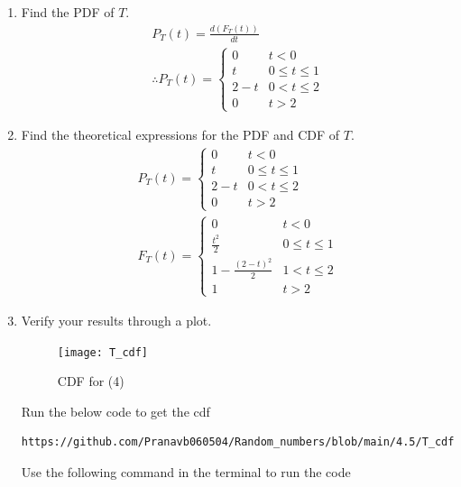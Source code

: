 \documentclass[journal,12pt,twocolumn]{IEEEtran}
\renewcommand\thesection{\arabic{section}}
\begin{document}
\begin{enumerate}[label=\thesection.\arabic*
,ref=\thesection.\theenumi]
\begin{align}
&=1-\frac{(2-t)^{2}}{2}\\
&\therefore F_{T}(t)=P(U_1 +U_2<t)=
\begin{cases}
0 & t<0\\
\frac{t^2}{2} & 0\leq t \leq 1\\
1-\frac{(2-t)^{2}}{2} & 1< t \leq 2\\
1 & t>2
\end{cases}
\end{align}
\item Find the PDF of $T$.\\
\solution 
\begin{align}
P_{T}(t)=\frac{d(F_{T}(t))}{dt}\\
\therefore P_{T}(t)=
\begin{cases}
0 & t<0\\
t & 0\leq t \leq 1\\
2-t  & 0< t \leq 2\\
0 & t>2 
\end{cases}    
\end{align}
\item Find the theoretical expressions for the PDF and CDF of $T$.
\\
\solution
\begin{align}
P_{T}(t)=
\begin{cases}
0 & t<0\\
t & 0\leq t \leq 1\\
2-t  & 0< t \leq 2\\
0 & t>2 
\end{cases} 
\\   
F_{T}(t)=
\begin{cases}
0 & t<0\\
\frac{t^2}{2} & 0\leq t \leq 1\\
1-\frac{(2-t)^{2}}{2} & 1< t \leq 2\\
1 & t>2
\end{cases}
\end{align}
\item Verify your results through a plot. 
\\
\solution 
 \begin{figure}[h]
\texttt{[image: T\_cdf]}
\caption{CDF for (4)}
\label{fig:T_CDF}
\end{figure}
Run the below code to get the cdf
\begin{lstlisting}
https://github.com/Pranavb060504/Random_numbers/blob/main/4.5/T_cdf.py
\end{lstlisting}
Use the following command in the terminal to run the code

\end{enumerate}
\end{document}
